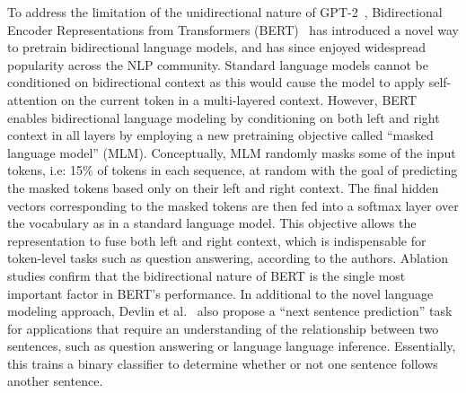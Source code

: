 To address the limitation of the unidirectional nature of GPT-2~\cite{radford2019language}, Bidirectional Encoder Representations from Transformers (BERT)~\cite{devlin2018bert} has introduced a novel way to pretrain bidirectional language models, and has since enjoyed widespread popularity across the NLP community.
Standard language models cannot be conditioned on bidirectional context as this would cause the model to apply self-attention on the current token in a multi-layered context.
However, BERT enables bidirectional language modeling by conditioning on both left and right context in all layers by employing a new pretraining objective called ``masked language model'' (MLM).
Conceptually, MLM randomly masks some of the input tokens, i.e: 15\% of tokens in each sequence, at random with the goal of predicting the masked tokens based only on their left and right context.
The final hidden vectors corresponding to the masked tokens are then fed into a softmax layer over the vocabulary as in a standard language model.
This objective allows the representation to fuse both left and right context, which is indispensable for token-level tasks such as question answering, according to the authors.
Ablation studies confirm that the bidirectional nature of BERT is the single most important factor in BERT's performance.
In additional to the novel language modeling approach, Devlin et al.~\cite{devlin2018bert} also propose a ``next sentence prediction'' task for applications that require an understanding of the relationship between two sentences, such as question answering or language language inference.
Essentially, this trains a binary classifier to determine whether or not one sentence follows another sentence.

